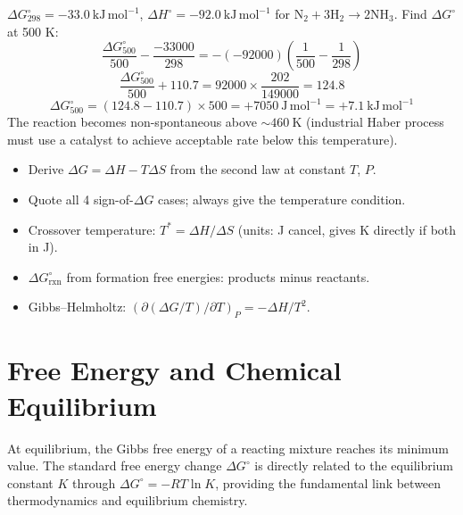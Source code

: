 \documentclass[12pt,a4paper]{article}
\begin{document}
\begin{tcolorbox}[examplebox, title={Solved Example: \texorpdfstring{$\Delta G$}{Delta G} at New Temperature}]
$\Delta G^\circ_{298} = -33.0\ \mathrm{kJ\,mol^{-1}}$, $\Delta H^\circ = -92.0\ \mathrm{kJ\,mol^{-1}}$ for $\mathrm{N_2 + 3H_2 \to 2NH_3}$.
Find $\Delta G^\circ$ at 500 K:
\[
\frac{\Delta G^\circ_{500}}{500} - \frac{-33000}{298} = -(-92000)\!\left(\frac{1}{500} - \frac{1}{298}\right)
\]
\[
\frac{\Delta G^\circ_{500}}{500} + 110.7 = 92000\times\frac{202}{149000} = 124.8
\]
\[
\Delta G^\circ_{500} = (124.8 - 110.7)\times 500 = +7050\ \mathrm{J\,mol^{-1}} = +7.1\ \mathrm{kJ\,mol^{-1}}
\]
The reaction becomes non-spontaneous above $\sim 460\ \mathrm{K}$ (industrial Haber process must use a catalyst to achieve acceptable rate below this temperature).
\end{tcolorbox}

\begin{tcolorbox}[exambox, title={Exam Points (Section 2)}]
\begin{itemize}[leftmargin=*, itemsep=2pt, topsep=2pt]
  \item Derive $\Delta G = \Delta H - T\Delta S$ from the second law at constant $T$, $P$.
  \item Quote all 4 sign-of-$\Delta G$ cases; always give the temperature condition.
  \item Crossover temperature: $T^* = \Delta H/\Delta S$ (units: J cancel, gives K directly if both in J).
  \item $\Delta G^\circ_{\mathrm{rxn}}$ from formation free energies: products minus reactants.
  \item Gibbs--Helmholtz: $(\partial(\Delta G/T)/\partial T)_P = -\Delta H/T^2$.
\end{itemize}
\end{tcolorbox}

\section{Free Energy and Chemical Equilibrium}

\begin{tcolorbox}[defbox]
At equilibrium, the Gibbs free energy of a reacting mixture reaches its minimum value. The standard free energy change $\Delta G^\circ$ is directly related to the equilibrium constant $K$ through $\Delta G^\circ = -RT\ln K$, providing the fundamental link between thermodynamics and equilibrium chemistry.
\end{tcolorbox}
\end{document}
